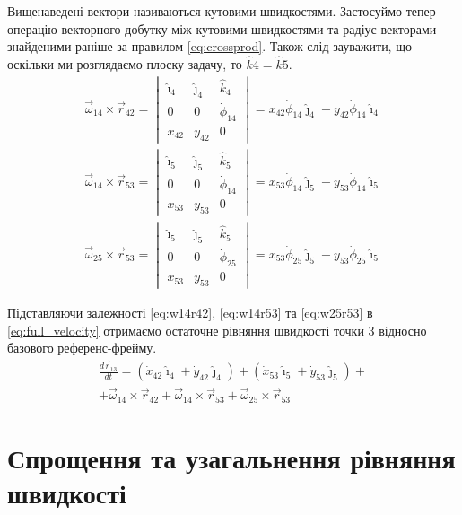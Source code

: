 \documentclass[12pt]{article}
\begin{document}
 	Вищенаведені вектори називаються кутовими швидкостями. Застосуймо тепер операцію векторного добутку між кутовими швидкостями та радіус-векторами знайденими раніше за правилом \ref{eq:crossprod}. Також слід зауважити, що оскільки ми розглядаємо плоску задачу, то $\hat{k}{4} = \hat{k}{5}$.
 	\begin{gather}
 	\vec{\omega}_{14} \times \vec{r}_{42} = \begin {vmatrix}
 	\hat{\imath}_{4} & \hat{\jmath}_{4} & \hat{k}_{4} \\
 	0 & 0 & \dot{\phi}_{14} \\
 	x_{42} & y_{42} & 0
    \end{vmatrix} = x_{42} \dot{\phi}_{14} \hat{\jmath}_{4} - y_{42} \dot{\phi}_{14} \hat{\imath}_{4} \label{eq:w14r42}\\ 
     \vec{\omega}_{14} \times \vec{r}_{53} = \begin {vmatrix}
 \hat{\imath}_{5} & \hat{\jmath}_{5} & \hat{k}_{5} \\
 0 & 0 & \dot{\phi}_{14} \\
 x_{53} & y_{53} & 0
 \end{vmatrix} = x_{53} \dot{\phi}_{14} \hat{\jmath}_{5} - y_{53} \dot{\phi}_{14} \hat{\imath}_{5} \label{eq:w14r53}\\
    \vec{\omega}_{25} \times \vec{r}_{53} = \begin {vmatrix}
 \hat{\imath}_{5} & \hat{\jmath}_{5} & \hat{k}_{5} \\
 0 & 0 & \dot{\phi}_{25} \\
 x_{53} & y_{53} & 0
 \end{vmatrix} = x_{53} \dot{\phi}_{25} \hat{\jmath}_{5} - y_{53} \dot{\phi}_{25} \hat{\imath}_{5} \label{eq:w25r53}
 	\end{gather}
 	
 	Підставляючи залежності \ref{eq:w14r42}, \ref{eq:w14r53} та \ref{eq:w25r53} в \ref{eq:full_velocity} отримаємо остаточне рівняння швидкості точки 3 відносно базового референс-фрейму.
 	\begin{multline} 
 	\label {eq:velocity_col}
 		\frac{d\vec{r}_{13}}{d t} = (\dot{x}_{42} \hat{\imath}_{4} + \dot{y}_{42} \hat{\jmath}_{4}) + (\dot{x}_{53} \hat{\imath}_{5} + \dot{y}_{53} \hat{\jmath}_{5}) +\\+ \vec{\omega}_{14} \times \vec{r}_{42} +  \vec{\omega}_{14} \times \vec{r}_{53} + \vec{\omega}_{25} \times \vec{r}_{53}
 	\end{multline}
 	
 	\section*{Спрощення та узагальнення рівняння швидкості}
 	
\end{document}
